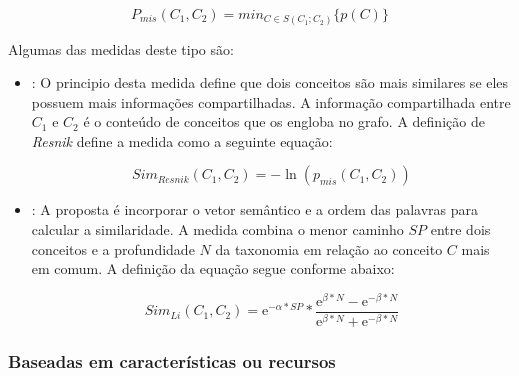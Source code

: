 	\begin{equation}
		P_{mis}(C_1, C_2) = min_{C \in S(C_1;C_2)} \{p(C)\}
	\label{eq:mis}
	\end{equation}

Algumas das medidas deste tipo são:

\begin{itemize}

	\item{\textbf{\cite{Resnik:1999}}: O principio desta medida define que dois conceitos são mais similares se eles possuem mais informações compartilhadas. A informação compartilhada entre $C_1$ e $C_2$ é o conteúdo de conceitos que os engloba no grafo. A definição de \textit{Resnik} define a medida como a seguinte equação:

	\begin{equation}
		Sim_{Resnik}(C_1, C_2) = - \ln (p_{mis}(C_1, C_2))
	\label{eq:resnik}
	\end{equation}}

	\item{\textbf{\cite{Lin1993PrincipleBasedPW}}: A proposta é incorporar o vetor semântico e a ordem das palavras para calcular a similaridade. A medida combina o menor caminho $SP$ entre dois conceitos e a profundidade $N$ da taxonomia em relação ao conceito $C$ mais em comum. A definição da equação segue conforme abaixo:

	\begin{equation}
		Sim_{Li}(C_1, C_2) = \mathrm{e}^{-\alpha * SP} * \frac{ \mathrm{e}^{\beta * N} - \mathrm{e}^{- \beta * N} }{ \mathrm{e}^{\beta * N} + \mathrm{e}^{- \beta * N} }
	\label{eq:li}
	\end{equation}}
\end{itemize}

\subsubsection{Baseadas em características ou recursos}

